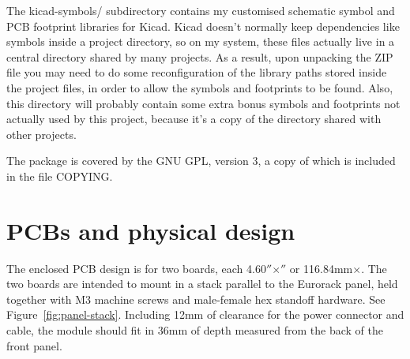 The kicad-symbols/ subdirectory contains my customised schematic symbol and
PCB footprint libraries for Kicad.  Kicad doesn't normally keep dependencies
like symbols inside a project directory, so on my system, these files
actually live in a central directory shared by many projects.  As a result,
upon unpacking the ZIP file you may need to do some reconfiguration of the
library paths stored inside the project files, in order to allow the symbols
and footprints to be found.  Also, this directory will probably contain some
extra bonus symbols and footprints not actually used by this project,
because it's a copy of the directory shared with other projects.

The package is covered by the GNU GPL, version 3, a copy of which is
included in the file COPYING.

\section{PCBs and physical design}

The enclosed PCB design is for two boards, each
4.60$''$\linebreak[0]$\times$$''$ or
116.84mm\linebreak[0]$\times$\linebreak[0]106.68mm.
The two boards are intended to
mount in a stack parallel to the Eurorack panel, held together with M3
machine screws and male-female hex standoff hardware.  See
Figure~\ref{fig:panel-stack}.  Including 12mm of clearance for the power
connector and cable, the module should fit in 36mm of depth measured from the
back of the front panel.

